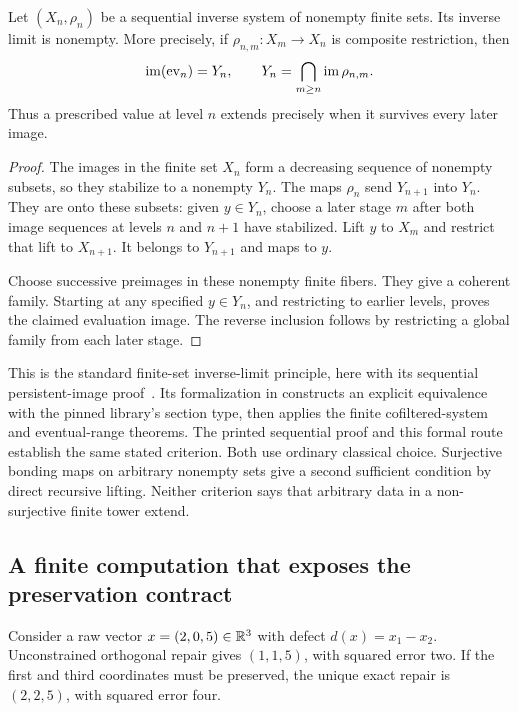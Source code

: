 \begin{proposition}\label{KS58}
Let \((X_n,\rho_n)\) be a sequential inverse system of nonempty finite sets. Its inverse limit is nonempty. More precisely, if \(\rho_{n,m}:X_m\to X_n\) is composite restriction, then
\[
 \operatorname{im}(\operatorname{ev}_n)=Y_n,
 \qquad Y_n=\bigcap_{m\ge n}\operatorname{im}\rho_{n,m}.
\]
Thus a prescribed value at level \(n\) extends precisely when it survives every later image.
\end{proposition}
\begin{proof}
The images in the finite set \(X_n\) form a decreasing sequence of nonempty subsets, so they stabilize to a nonempty \(Y_n\). The maps \(\rho_n\) send \(Y_{n+1}\) into \(Y_n\). They are onto these subsets: given \(y\in Y_n\), choose a later stage \(m\) after both image sequences at levels \(n\) and \(n+1\) have stabilized. Lift \(y\) to \(X_m\) and restrict that lift to \(X_{n+1}\). It belongs to \(Y_{n+1}\) and maps to \(y\).

Choose successive preimages in these nonempty finite fibers. They give a coherent family. Starting at any specified \(y\in Y_n\), and restricting to earlier levels, proves the claimed evaluation image. The reverse inclusion follows by restricting a global family from each later stage.
\end{proof}
This is the standard finite-set inverse-limit principle, here with its sequential persistent-image proof~\cite{stacks-limits}. Its formalization in  constructs an explicit equivalence with the pinned library's section type, then applies the finite cofiltered-system and eventual-range theorems. The printed sequential proof and this formal route establish the same stated criterion. Both use ordinary classical choice. Surjective bonding maps on arbitrary nonempty sets give a second sufficient condition by direct recursive lifting. Neither criterion says that arbitrary data in a non-surjective finite tower extend.

\subsection{A finite computation that exposes the preservation contract}
Consider a raw vector \(x=(2,0,5)\in\mathbb R^3\) with defect \(d(x)=x_1-x_2\). Unconstrained orthogonal repair gives \((1,1,5)\), with squared error two. If the first and third coordinates must be preserved, the unique exact repair is \((2,2,5)\), with squared error four.

